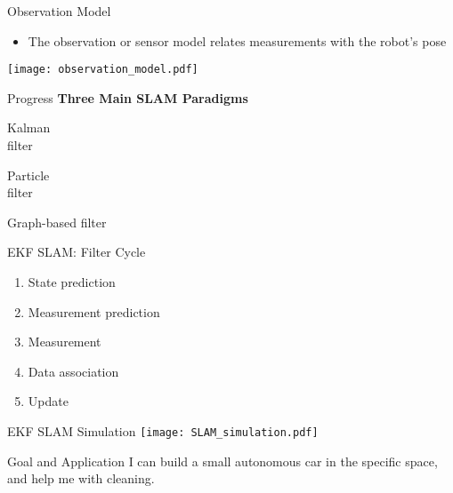\documentclass{beamer}
\begin{document}
\begin{frame}{Observation Model}
\begin{itemize}
\item The observation or sensor model relates measurements with the robot's pose
\end{itemize}
\centering
\texttt{[image: observation\_model.pdf]}
\end{frame}

\begin{frame}{Progress}
\textbf{Three Main SLAM Paradigms}
\begin{multicols}{3}
\begin{tcolorbox}[colback=blue!5!white,colframe=red!75!black]
\centering
Kalman\\
filter
\end{tcolorbox}
\begin{tcolorbox}[colback=blue!5!white,colframe=blue!75!black]
\centering
Particle\\
filter
\end{tcolorbox}
\begin{tcolorbox}[colback=blue!5!white,colframe=blue!75!black]
\centering
Graph-based filter
\end{tcolorbox}
\end{multicols}
\end{frame}

\begin{frame}[t]{EKF SLAM: Filter Cycle}
\begin{enumerate}[1]
\item State prediction
\item Measurement prediction
\item Measurement
\item Data association
\item Update
\end{enumerate}
\end{frame}

\begin{frame}{EKF SLAM Simulation}
\centering
\texttt{[image: SLAM\_simulation.pdf]}
\end{frame}

\begin{frame}{Goal and Application}
I can build a small autonomous car in the specific space, and help me with cleaning. 
\end{frame}
\end{document}
